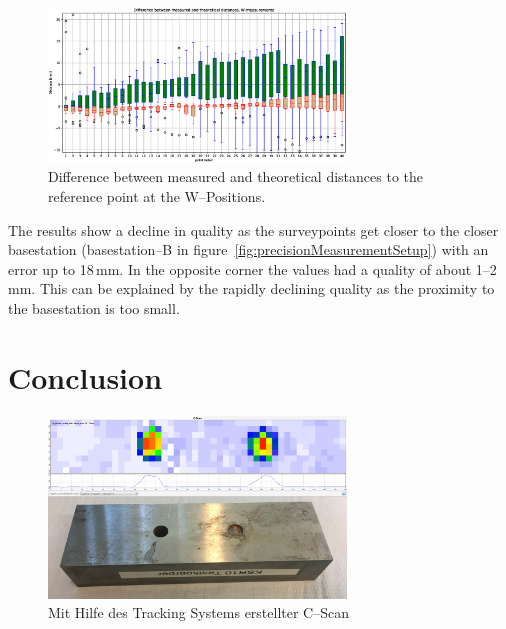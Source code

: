 \documentclass{VRARWorkshop}
\begin{document}
\begin{figure}[h!]
    \begin{center}
        \includegraphics[width=79mm]{images/distancesBoxplot-W.eps}
        \caption{\label{fig:boxplotW} Difference between measured and theoretical distances to the reference point at the W--Positions.}
    \end{center}
\end{figure}

The results show a decline in quality as the surveypoints get closer to the closer basestation (basestation--B in figure~\ref{fig:precisionMeasurementSetup}) with an error up to 18\,mm.
In the opposite corner the values had a quality of about 1--2\,mm.
This can be explained by the rapidly declining quality as the proximity to the basestation is too small.

\section{Conclusion}

\begin{figure}[h!]
    \begin{center}
        \includegraphics[width=79mm]{images/CScanARUS.jpg}
        \caption{\label{fig:resultCScan} Mit Hilfe des Tracking Systems erstellter C--Scan}
    \end{center}
\end{figure}

\VRARsetbibstyle

\end{document}
